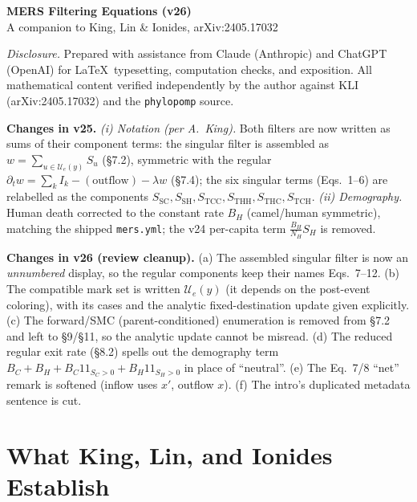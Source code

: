 \documentclass[11pt]{article}
\newcommand{\ind}{1\!\!1}
\theoremstyle{plain}
\begin{document}
\begin{center}
{\large\bfseries MERS Filtering Equations (v26)}\\[2pt]
{\small A companion to King, Lin \& Ionides, arXiv:2405.17032}
\end{center}
\medskip

\tableofcontents
\bigskip

\medskip
\noindent\textit{Disclosure.} Prepared with assistance from Claude (Anthropic) and ChatGPT
(OpenAI) for \LaTeX\ typesetting, computation checks, and exposition. All mathematical content
verified independently by the author against KLI (arXiv:2405.17032) and the \texttt{phylopomp} source.
\bigskip

\begin{notebox}
\textbf{Changes in v25.} \emph{(i) Notation (per A.~King).} Both filters are now written as sums of
their component terms: the singular filter is assembled as $w=\sum_{u\in\mathcal U_e(y)}S_u$ (\S7.2),
symmetric with the regular $\partial_t w=\sum_{k}I_k-(\text{outflow})-\lambda w$ (\S7.4); the six
singular terms (Eqs.~1--6) are relabelled as the components
$S_{\mathrm{SC}},S_{\mathrm{SH}},S_{\mathrm{TCC}},S_{\mathrm{THH}},S_{\mathrm{THC}},S_{\mathrm{TCH}}$.
\emph{(ii) Demography.} Human death corrected to the constant rate $B_H$ (camel/human symmetric),
matching the shipped \texttt{mers.yml}; the v24 per-capita term $\tfrac{B_H}{N_H}S_H$ is removed.

\smallskip
\textbf{Changes in v26 (review cleanup).} (a) The assembled singular filter is now an \emph{unnumbered}
display, so the regular components keep their names Eqs.~7--12. (b) The compatible mark set is written
$\mathcal U_e(y)$ (it depends on the post-event coloring), with its cases and the analytic
fixed-destination update given explicitly. (c) The forward/SMC (parent-conditioned) enumeration is
removed from \S7.2 and left to \S9/\S11, so the analytic update cannot be misread. (d) The reduced
regular exit rate (\S8.2) spells out the demography term $B_C+B_H+B_C\ind_{S_C>0}+B_H\ind_{S_H>0}$ in
place of ``neutral''. (e) The Eq.~7/8 ``net'' remark is softened (inflow uses $x'$, outflow $x$).
(f) The intro's duplicated metadata sentence is cut.
\end{notebox}

\section{What King, Lin, and Ionides Establish}
\end{document}
